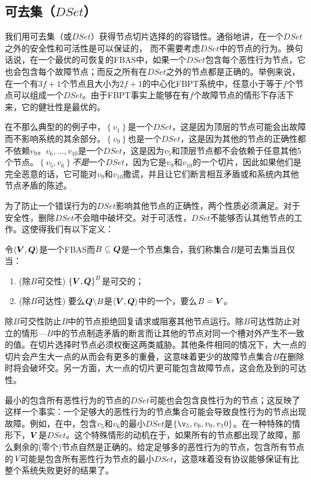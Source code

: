 \subsection{可去集（$DSet$）}
我们用可去集（或$DSet$）获得节点切片选择的的容错性。通俗地讲，在一个$DSet$之外的安全性和可活性是可以保证的，	而不需要考虑$DSet$中的节点的行为。换句话说，在一个最优的可恢复的FBAS中，如果一个$DSet$包含每个恶性行为节点，它也会包含每个故障节点；而反之所有在$DSet$之外的节点都是正确的。举例来说，在一个有$3f+1$个节点且{\quorum}大小为$2f+1$的中心化FBPT系统中，任意小于等于$f$个节点可以组成一个$DSet$。由于FBPT事实上能够在有$f$个故障节点的情形下存活下来，它的健壮性是最优的。

在不那么典型的的例子中，$\left\{v_1\right\}$是一个$DSet$，这是因为顶层的节点可能会出故障而不影响系统的其余部分。$\left\{v_9\right\}$也是一个$DSet$，这是因为其他的节点的正确性都不依赖$v_9$。$v_6,\ldots,v_10$是一个$DSet$，这是因为$v_5$和顶层节点都不会依赖于任意其他5个节点。$\left\{v_5,v_6\right\}$\textit{不是}一个$DSet$，因为它是$v_9$和$v_10$的一个切片，因此如果他们是完全恶意的话，它可能对$v_9$和$v_10$撒谎，并且让它们断言相互矛盾或和系统内其他节点矛盾的陈述。

为了防止一个错误行为的$DSet$影响其他节点的正确性，两个性质必须满足。对于安全性，删除$DSet$不会暗中破坏{\quorum}交。对于可活性，$DSet$不能够否认其他节点的工作{\quorum}。这使得我们有以下定义：

\begin{definition}[DSet]
	令$\langle{\bm V},{\bm Q}\rangle$是一个FBAS而$B\subseteq {\bm Q}$是一个节点集合，我们称集合$B$是可去集当且仅当：
	\begin{enumerate}
		\item (除$B${\quorum}可交性) $\left\{{\bm V},{\bm Q}\right\}^{B}$是{\quorum}可交的；
		\item (除$B${\quorum}可达性) 要么${\bm Q}\backslash B$是$\langle{\bm V},{\bm Q}\rangle$中的一个{\quorum}，要么$B={\bm V}$。
	\end{enumerate}
\end{definition}

除$B${\quorum}可交性防止$B$中的节点拒绝回复请求或阻塞其他节点运行。除$B${\quorum}可达性防止对立的情形---$B$中的节点制造矛盾的断言而让其他的节点对同一个槽对外产生不一致的值。在切片选择时节点必须权衡这两类威胁。其他条件相同的情况下，大一点的切片会产生大一点的{\quorum}从而会有更多的重叠，这意味着更少的故障节点集合$B$在删除时将会破坏{\quorum}交。另一方面，大一点的切片更可能包含故障节点，这会危及到{\quorum}的可达性。

最小的包含所有恶性行为的节点的$DSet$可能也会包含良性行为的节点；这反映了这样一个事实：一个足够大的恶性行为的节点集合可能会导致良性行为的节点出现故障。例如，在中，包含$v_5$和$v_6$的最小$DSet$是$\left\{\v_5,v_6,v_9,v_10\right\}$。在一种特殊的情形下，${\bm V}$是$DSet$。这个特殊情形的动机在于，如果所有的节点都出现了故障，那么剩余的(零个)节点自然是正确的。给定足够多的恶性行为的节点，包含所有节点的$\emph{V}$可能是包含所有恶性行为节点的最小$DSet$，这意味着没有协议能够保证有比整个系统失败更好的结果了。

